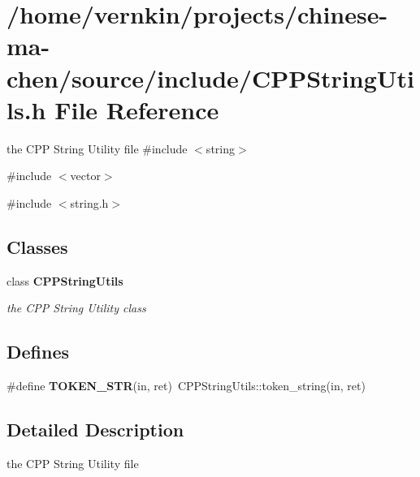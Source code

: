 \section{/home/vernkin/projects/chinese-\/ma-\/chen/source/include/CPPStringUtils.h File Reference}
\label{CPPStringUtils_8h}


the CPP String Utility file  
{\ttfamily \#include $<$string$>$}\par
{\ttfamily \#include $<$vector$>$}\par
{\ttfamily \#include $<$string.h$>$}\par
\subsection*{Classes}
\begin{DoxyCompactItemize}
\item 
class {\bf CPPStringUtils}
\begin{DoxyCompactList}\small\item\em the CPP String Utility class \item\end{DoxyCompactList}\end{DoxyCompactItemize}
\subsection*{Defines}
\begin{DoxyCompactItemize}
\item 
\#define {\bfseries TOKEN\_\-STR}(in, ret)~CPPStringUtils::token\_\-string(in, ret)\label{CPPStringUtils_8h_a0c4bf3840f8463665e3d39163a903a37}

\end{DoxyCompactItemize}


\subsection{Detailed Description}
the CPP String Utility file 